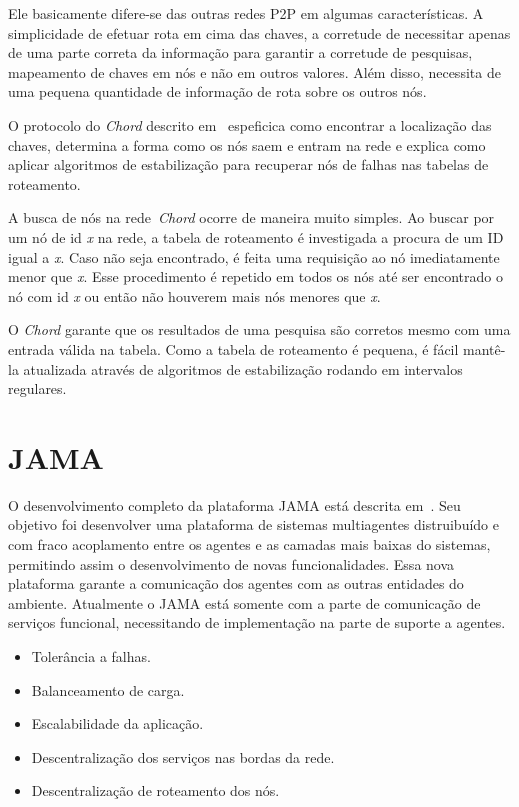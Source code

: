 Ele basicamente difere-se das outras redes P2P em algumas características. A simplicidade de efetuar rota em cima das chaves, a corretude de necessitar apenas de uma parte correta da informação para garantir a corretude de pesquisas, mapeamento de chaves em nós e não em outros valores. Além disso, necessita de uma pequena quantidade de informação de rota sobre os outros nós.

O protocolo do \emph{Chord} descrito em~\cite{stoica01} espeficica como encontrar a localização das chaves, determina a forma como os nós saem e entram na rede e explica como aplicar algoritmos de estabilização para recuperar nós de falhas nas tabelas de roteamento.

A busca de nós na rede~\emph{Chord} ocorre de maneira muito simples. Ao buscar por um nó de id \emph{x} na rede, a tabela de roteamento é investigada a procura de um ID igual a \emph{x}. Caso não seja encontrado, é feita uma requisição ao nó imediatamente menor que \emph{x}. Esse procedimento é repetido em todos os nós até ser encontrado o nó com id \emph{x} ou então não houverem mais nós menores que \emph{x}.

O \emph{Chord} garante que os resultados de uma pesquisa são corretos mesmo com uma entrada válida na tabela. Como a tabela de roteamento é pequena, é fácil mantê-la atualizada através de algoritmos de estabilização rodando em intervalos regulares.

\section{JAMA}

O desenvolvimento completo da plataforma JAMA está descrita em~\cite{parise11}. Seu objetivo foi desenvolver uma plataforma de sistemas multiagentes distruibuído e com fraco acoplamento entre os agentes e as camadas mais baixas do sistemas, permitindo assim o desenvolvimento de novas funcionalidades. Essa nova plataforma garante a comunicação dos agentes com as outras entidades do ambiente. Atualmente o JAMA está somente com a parte de comunicação de serviços funcional, necessitando de implementação na parte de suporte a agentes.
\begin{itemize}
	\item Tolerância a falhas.
	\item Balanceamento de carga.
	\item Escalabilidade da aplicação.
	\item Descentralização dos serviços nas bordas da rede.
	\item Descentralização de roteamento dos nós.
\end{itemize}


